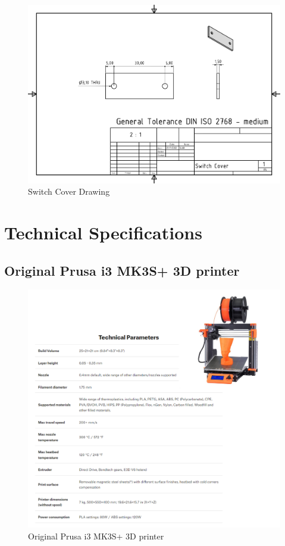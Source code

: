 \begin{figure}[H]
    \centering
    \includegraphics[width=1.3\linewidth, angle = 90]{texs/appendix/data/technicaldrawing/switchcover.jpg}
    \caption{Switch Cover Drawing}
    \label{fig:cad-drawing-switchcover}
\end{figure}

\section{Technical Specifications}
\subsection{Original Prusa i3 MK3S+ 3D printer}
\label{appendix:original-prusa-i3-mk3s-3d-printer}

\begin{figure}[H]
    \centering
    \includegraphics[width=\linewidth]{texs/appendix/data/techspecs/prusa.png}
    \caption{Original Prusa i3 MK3S+ 3D printer}
    \label{fig:3d-printer-1}
\end{figure}


